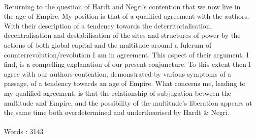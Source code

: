 \documentclass[12pt,a4paper,titlepage]{article}
\begin{document}
\paragraph{}Returning to the question of Hardt and Negri's contention that we now live in the age of Empire. My position is that of a qualified agreement with the authors. With their description of a tendency towards the deterritorialisation, decentralisation and destabilisation of the sites and structures of power by the actions of both global capital and the multitude around a fulcrum of counterrevolution/revolution I am in agreement. This aspect of their argument, I find, is a compelling explanation of our present conjuncture. To this extent then I agree with our authors contention, demonstrated by various symptoms of a passage, of a tendency towards an age of Empire. What concerns me, leading to my qualified agreement, is that the relationship of subjugation between the multitude and Empire, and the possibility of the multitude's liberation appears at the same time both overdetermined and undertheorised by Hardt \& Negri.
\bigskip
\paragraph{}Words : 3143
\newpage
\singlespacing
{}

\end{document}
